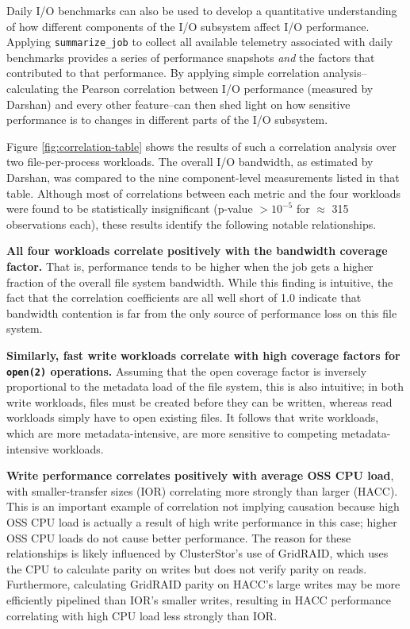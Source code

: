 Daily I/O benchmarks can also be used to develop a quantitative understanding of how different components of the I/O subsystem affect I/O performance.
Applying \texttt{summarize\_job} to collect all available telemetry associated with daily benchmarks provides a series of performance snapshots \emph{and} the factors that contributed to that performance.
By applying simple correlation analysis--calculating the Pearson correlation between I/O performance (measured by Darshan) and every other feature--can then shed light on how sensitive performance is to changes in different parts of the I/O subsystem.

Figure \ref{fig:correlation-table} shows the results of such a correlation analysis over two file-per-process workloads.
The overall I/O bandwidth, as estimated by Darshan, was compared to the nine component-level measurements listed in that table.
Although most of correlations between each metric and the four workloads were found to be statistically insignificant (p-value $> 10^{-5}$ for $\approx$ 315 observations each), these results identify the following notable relationships.

\textbf{All four workloads correlate positively with the bandwidth coverage factor.}  That is, performance tends to be higher when the job gets a higher fraction of the overall file system bandwidth.
While this finding is intuitive, the fact that the correlation coefficients are all well short of 1.0 indicate that bandwidth contention is far from the only source of performance loss on this file system.

\textbf{Similarly, fast write workloads correlate with high coverage factors for \texttt{open(2)} operations.}  Assuming that the open coverage factor is inversely proportional to the metadata load of the file system, this is also intuitive; in both write workloads, files must be created before they can be written, whereas read workloads simply have to open existing files.
It follows that write workloads, which are more metadata-intensive, are more sensitive to competing metadata-intensive workloads.

\textbf{Write performance correlates positively with average OSS CPU load}, with smaller-transfer sizes (IOR) correlating more strongly than larger (HACC).
This is an important example of correlation not implying causation because high OSS CPU load is actually a result of high write performance in this case; higher OSS CPU loads do not cause better performance.
The reason for these relationships is likely influenced by ClusterStor's use of GridRAID, which uses the CPU to calculate parity on writes but does not verify parity on reads.
Furthermore, calculating GridRAID parity on HACC's large writes may be more efficiently pipelined than IOR's smaller writes, resulting in HACC performance correlating with high CPU load less strongly than IOR.


